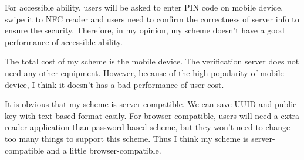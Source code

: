 \begin{CJK}{Bg5}{bsmi}
For accessible ability, users will be asked to enter PIN code on mobile device, swipe it to NFC reader and users need to confirm the correctness of server info to ensure the security. Therefore, in my opinion, my scheme doesn't have a good performance of accessible ability.

The total cost of my scheme is the mobile device. The verification server does not need any other equipment. However, because of the high popularity of mobile device, I think it doesn't has a bad performance of user-cost.

It is obvious that my scheme is server-compatible. We can save UUID and public key with text-based format easily. For browser-compatible, users will need a extra reader application than password-based scheme, but they won't need to change too many things to support this scheme. Thus I think my scheme is server-compatible and a little browser-compatible. 

\end{CJK}